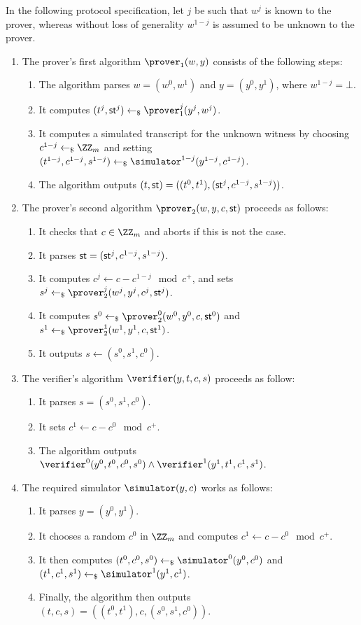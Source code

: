 \documentclass[runningheads]{llncs}
\begin{document}
  In the following protocol specification, let $j$ be such that $w^j$ is known to the prover, whereas without loss of generality $w^{1-j}$ is assumed to be unknown to the prover.
\begin{enumerate}
  \item
    The prover's first algorithm $\prover_1(w,y)$ consists of the following steps:
    \begin{enumerate}
      \item
        The algorithm parses $w=(w^0,w^1)$ and $y=(y^0,y^1)$, where $w^{1-j}=\bot$.
      \item
        It computes $(t^j,\st^j)\getsr\prover_1^j(y^j,w^j)$.
      \item
        It computes a simulated transcript for the unknown witness by choosing $c^{1-j}\getsr\ZZ_m$ and setting $(t^{1-j},c^{1-j},s^{1-j})\getsr\simulator^{1-j}(y^{1-j},c^{1-j})$.
      \item
	The algorithm outputs $(t,\mathsf{st}) = ((t^0,t^1),(\mathsf{st}^j,c^{1-j},s^{1-j}))$.
    \end{enumerate}
  \item
    The prover's second algorithm $\prover_2(w,y,c,\st)$ proceeds as follows:
    \begin{enumerate}
      \item
        It checks that $c\in\ZZ_m$ and aborts if this is not the case.
      \item
	It parses $\mathsf{st}=(\mathsf{st}^j,c^{1-j},s^{1-j})$.
      \item
        It computes $c^j\gets c-c^{1-j}\mod c^+$, and sets $s^j\getsr\prover_2^j(w^j,y^j,c^j,\st^j)$.
      \item
        It computes $s^0\getsr\prover_2^0(w^0,y^0,c,\st^0)$ and $s^1\getsr\prover_2^1(w^1,y^1,c,\st^1)$.
      \item
        It outputs $s\gets(s^0,s^1,c^0)$.
    \end{enumerate}
  \item
    The verifier's algorithm $\verifier(y,t,c,s)$ proceeds as follow:
    \begin{enumerate}
      \item
        It  parses $s=(s^0,s^1,c^0)$.
      \item 
        It sets $c^1\gets c-c^0\mod c^+$.
      \item
	The algorithm outputs $\verifier^0(y^0,t^0,c^0,s^0)\land\verifier^1(y^1,t^1,c^1,s^1)$.
    \end{enumerate}
  \item
    The required simulator $\simulator(y,c)$ works as follows:
    \begin{enumerate}
      \item
        It parses $y=(y^0,y^1)$.
      \item
        It chooses a random $c^0$ in $\ZZ_m$ and computes $c^1\gets c-c^0 \mod c^+$.
      \item
        It then computes $(t^0,c^0,s^0)\getsr\simulator^0(y^0,c^0)$ and $(t^1,c^1,s^1)\getsr\simulator^1(y^1,c^1)$.
      \item
        Finally, the algorithm then outputs $(t,c,s)=((t^0,t^1),c,(s^0,s^1,c^0))$.
    \end{enumerate}
\end{enumerate}
\end{document}
